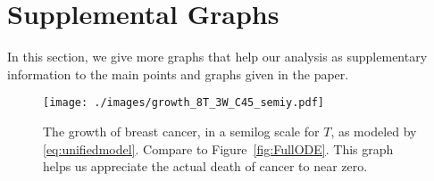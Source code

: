 \documentclass[11pt]{amsart}
\begin{document}
\section{Supplemental Graphs}
\label{appendix:graphs}
In this section, we give more graphs that help our analysis as supplementary information to the main points and graphs given in the paper.
\begin{figure}[h!]
\begin{center} %
\texttt{[image: ./images/growth\_8T\_3W\_C45\_semiy.pdf]} %
\end{center}
\caption{The growth of breast cancer, in a semilog scale for $T$, as modeled by \eqref{eq:unifiedmodel}. Compare to Figure~\ref{fig:FullODE}. This graph helps us appreciate the actual death of cancer to near zero.}
\label{fig:FullODE_semiy} %
\end{figure}
\newpage

\nocite{*}
\end{document}
